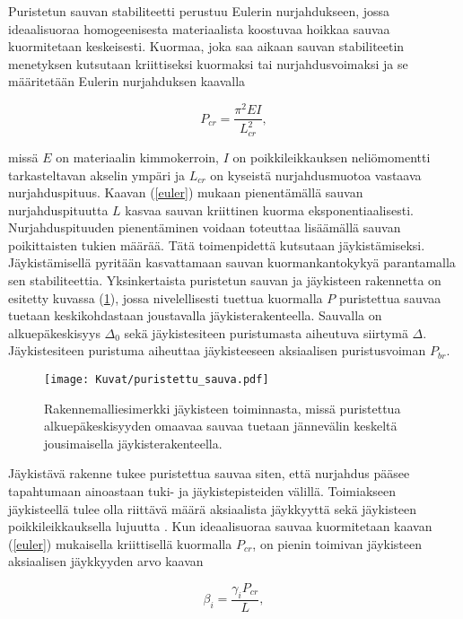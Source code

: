 \documentclass[12pt]{article}
\newenvironment{content}{\pagenumbering{arabic}}{}
\begin{document}
\begin{content}
Puristetun sauvan stabiliteetti perustuu Eulerin nurjahdukseen, jossa ideaalisuoraa homogeenisesta materiaalista koostuvaa hoikkaa sauvaa kuormitetaan keskeisesti. Kuormaa, joka saa aikaan sauvan stabiliteetin menetyksen kutsutaan kriittiseksi kuormaksi tai nurjahdusvoimaksi ja se määritetään Eulerin nurjahduksen kaavalla

\begin{equation}
\label{euler}
P_{cr} = \frac{\pi^2 E I}{L_{cr}^2},
\end{equation}

missä $E$ on materiaalin kimmokerroin, $I$ on poikkileikkauksen neliömomentti tarkasteltavan akselin ympäri ja $L_{cr}$ on kyseistä nurjahdusmuotoa vastaava nurjahduspituus. Kaavan (\ref{euler}) mukaan pienentämällä sauvan nurjahduspituutta $L$ kasvaa sauvan kriittinen kuorma eksponentiaalisesti. Nurjahduspituuden pienentäminen voidaan toteuttaa lisäämällä sauvan poikittaisten tukien määrää. Tätä toimenpidettä kutsutaan jäykistämiseksi. Jäykistämisellä pyritään kasvattamaan sauvan kuormankantokykyä parantamalla sen stabiliteettia. Yksinkertaista puristetun sauvan ja jäykisteen rakennetta on esitetty kuvassa (\ref{fig:puristettu_sauva}), jossa nivelellisesti tuettua kuormalla $P$ puristettua sauvaa tuetaan keskikohdastaan joustavalla jäykisterakenteella. Sauvalla on alkuepäkeskisyys $\Delta_0$ sekä jäykistesiteen puristumasta aiheutuva siirtymä $\Delta$. Jäykistesiteen puristuma aiheuttaa jäykisteeseen aksiaalisen puristusvoiman $P_{br}$.

\begin{figure}[htb]
\centering
\texttt{[image: Kuvat/puristettu\_sauva.pdf]}
\caption{Rakennemalliesimerkki jäykisteen toiminnasta, missä puristettua alkuepäkeskisyyden omaavaa sauvaa tuetaan jännevälin keskeltä jousimaisella jäykisterakenteella.}
\label{fig:puristettu_sauva}
\end{figure}

Jäykistävä rakenne tukee puristettua sauvaa siten, että nurjahdus pääsee tapahtumaan ainoastaan tuki- ja jäykistepisteiden välillä. Toimiakseen jäykisteellä tulee olla riittävä määrä aksiaalista jäykkyyttä sekä jäykisteen poikkileikkauksella lujuutta \parencite{winter}. Kun ideaalisuoraa sauvaa kuormitetaan kaavan (\ref{euler}) mukaisella kriittisellä kuormalla $P_{cr}$, on pienin toimivan jäykisteen aksiaalisen jäykkyyden arvo kaavan

\begin{equation}
\label{ideaalijäykkyys}
\beta_i = \frac{\gamma_i P_{cr}}{L},
\end{equation}


\end{content}
\end{document}
